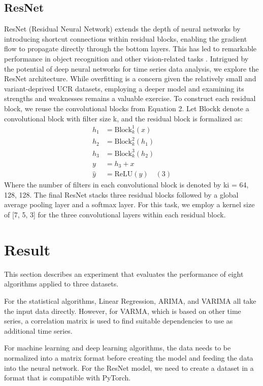 \documentclass{ieeeojies}
\begin{document}
\subsection{ResNet}
ResNet (Residual Neural Network) extends the depth of neural networks by introducing shortcut connections within residual blocks, enabling the gradient flow to propagate directly through the bottom layers. This has led to remarkable performance in object recognition and other vision-related tasks {\cite{b21}}. Intrigued by the potential of deep neural networks for time series data analysis, we explore the ResNet architecture. While overfitting is a concern given the relatively small and variant-deprived UCR datasets, employing a deeper model and examining its strengths and weaknesses remains a valuable exercise. To construct each residual block, we reuse the convolutional blocks from Equation 2. Let Blockk denote a convolutional block with filter size k, and the residual block is formalized as:
\begin{align*}
h_1 &= \text{Block}_k^1(x) \\
h_2 &= \text{Block}_k^2(h_1) \\
h_3 &= \text{Block}_k^3(h_2) \\
y &= h_3 + x \\
\hat{y} &= \text{ReLU}(y) \quad (3)
\end{align*}
Where the number of filters in each convolutional block is denoted by ki = {64, 128, 128}. The final ResNet stacks three residual blocks followed by a global average pooling layer and a softmax layer. For this task, we employ a kernel size of [7, 5, 3] for the three convolutional layers within each residual block.
\section{Result}
This section describes an experiment that evaluates the performance of eight algorithms applied to three datasets. 

For the statistical algorithms, Linear Regression, ARIMA, and VARIMA all take the input data directly. However, for VARMA, which is based on other time series, a correlation matrix is used to find suitable dependencies to use as additional time series.

For machine learning and deep learning algorithms, the data needs to be normalized into a matrix format before creating the model and feeding the data into the neural network. For the ResNet model, we need to create a dataset in a format that is compatible with PyTorch.
\end{document}
